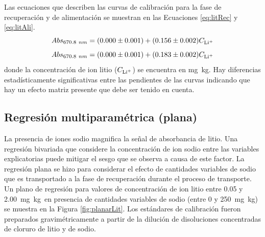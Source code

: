 \clearpage Las ecuaciones que describen las curvas de calibración para la fase de recuperación y de alimentación se muestran en las Ecuaciones \ref{eq:litRec} y \ref{eq:litAli}.
\begin{equation}\label{eq:litRec}
    Abs_{670.8~nm}=(0.000\pm0.001)+(0.156\pm0.002) C_{\ce{Li^+}}
\end{equation}
\begin{equation}\label{eq:litAli}
    Abs_{670.8~nm}=(0.000\pm0.001)+(0.183\pm0.002) C_{\ce{Li^+}}
\end{equation}
donde la concentración de ion litio ($C_{\ce{Li^+}}$) se encuentra en mg~kg\mnn. Hay diferencias estadísticamente significativas entre las pendientes de las curvas indicando que hay un efecto matriz presente que debe ser tenido en cuenta.


\subsection{Regresión multiparamétrica (plana)}\label{sec:planar1}
La presencia de iones sodio magnifica la señal de absorbancia de litio. Una regresión bivariada que considere la concentración de ion sodio entre las variables explicatorias puede mitigar el sesgo que se observa a causa de este factor. La regresión plana se hizo para considerar el efecto de cantidades variables de sodio que es transportado a la fase de recuperación durante el proceso de transporte. Un plano de regresión para valores de concentración de ion litio entre 0.05 y 2.00~mg~kg\mnn\ en presencia de cantidades variables de sodio (entre 0 y 250~mg~kg\mnn) se muestra en la Figura \ref{fig:planarLit}. Los estándares de calibración fueron preparados gravimétricamente a partir de la dilución de disoluciones concentradas de cloruro de litio y de sodio.

